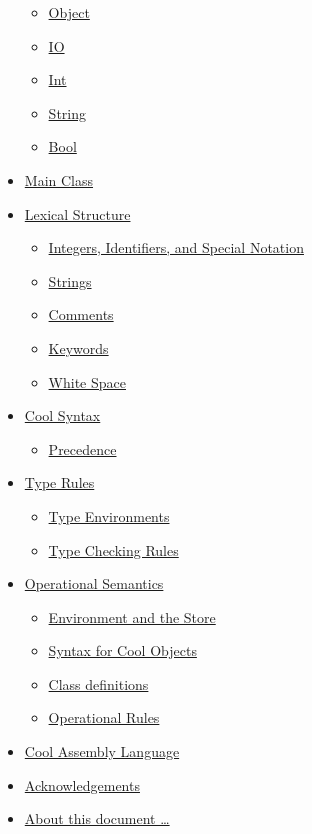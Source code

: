 \documentclass[]{article}
\begin{document}
\begin{itemize}
  \begin{itemize}
  \itemsep1pt\parskip0pt
  \item
    \href{node27.html}{Object}
  \item
    \href{node28.html}{IO}
  \item
    \href{node29.html}{Int}
  \item
    \href{node30.html}{String}
  \item
    \href{node31.html}{Bool}
  \end{itemize}
\item
  \href{node32.html}{Main Class}
\item
  \href{node33.html}{Lexical Structure}

  \begin{itemize}
  \itemsep1pt\parskip0pt
  \item
    \href{node34.html}{Integers, Identifiers, and Special Notation}
  \item
    \href{node35.html}{Strings}
  \item
    \href{node36.html}{Comments}
  \item
    \href{node37.html}{Keywords}
  \item
    \href{node38.html}{White Space}
  \end{itemize}
\item
  \href{node39.html}{Cool Syntax}

  \begin{itemize}
  \itemsep1pt\parskip0pt
  \item
    \href{node40.html}{Precedence}
  \end{itemize}
\item
  \href{node41.html}{Type Rules}

  \begin{itemize}
  \itemsep1pt\parskip0pt
  \item
    \href{node42.html}{Type Environments}
  \item
    \href{node43.html}{Type Checking Rules}
  \end{itemize}
\item
  \href{node44.html}{Operational Semantics}

  \begin{itemize}
  \itemsep1pt\parskip0pt
  \item
    \href{node45.html}{Environment and the Store}
  \item
    \href{node46.html}{Syntax for Cool Objects}
  \item
    \href{node47.html}{Class definitions}
  \item
    \href{node48.html}{Operational Rules}
  \end{itemize}
\item
  \href{node51.html}{Cool Assembly Language} \\
\item
  \href{node49.html}{Acknowledgements}
\item
  \href{node50.html}{About this document \ldots{}}
\end{itemize}
\end{document}
